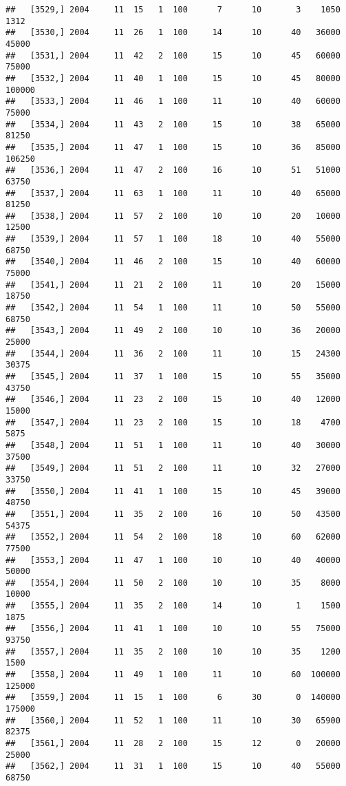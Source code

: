 \documentclass{article}\usepackage[]{graphicx}\usepackage[]{color}
\makeatletter
\newenvironment{kframe}{%
 \def\at@end@of@kframe{}%
 \ifinner\ifhmode%
  \def\at@end@of@kframe{\end{minipage}}%
  \begin{minipage}{\columnwidth}%
 \fi\fi%
 \def\FrameCommand##1{\hskip\@totalleftmargin \hskip-\fboxsep
 \colorbox{shadecolor}{##1}\hskip-\fboxsep
     \hskip-\linewidth \hskip-\@totalleftmargin \hskip\columnwidth}%
 \MakeFramed {\advance\hsize-\width
   \@totalleftmargin\z@ \linewidth\hsize
   \@setminipage}}%
 {\par\unskip\endMakeFramed%
 \at@end@of@kframe}
\newenvironment{knitrout}{}{} %
\makeatother
\begin{document}
\begin{knitrout}
\begin{kframe}
\begin{verbatim}
##   [3529,] 2004     11  15   1  100      7      10       3    1050    1312
##   [3530,] 2004     11  26   1  100     14      10      40   36000   45000
##   [3531,] 2004     11  42   2  100     15      10      45   60000   75000
##   [3532,] 2004     11  40   1  100     15      10      45   80000  100000
##   [3533,] 2004     11  46   1  100     11      10      40   60000   75000
##   [3534,] 2004     11  43   2  100     15      10      38   65000   81250
##   [3535,] 2004     11  47   1  100     15      10      36   85000  106250
##   [3536,] 2004     11  47   2  100     16      10      51   51000   63750
##   [3537,] 2004     11  63   1  100     11      10      40   65000   81250
##   [3538,] 2004     11  57   2  100     10      10      20   10000   12500
##   [3539,] 2004     11  57   1  100     18      10      40   55000   68750
##   [3540,] 2004     11  46   2  100     15      10      40   60000   75000
##   [3541,] 2004     11  21   2  100     11      10      20   15000   18750
##   [3542,] 2004     11  54   1  100     11      10      50   55000   68750
##   [3543,] 2004     11  49   2  100     10      10      36   20000   25000
##   [3544,] 2004     11  36   2  100     11      10      15   24300   30375
##   [3545,] 2004     11  37   1  100     15      10      55   35000   43750
##   [3546,] 2004     11  23   2  100     15      10      40   12000   15000
##   [3547,] 2004     11  23   2  100     15      10      18    4700    5875
##   [3548,] 2004     11  51   1  100     11      10      40   30000   37500
##   [3549,] 2004     11  51   2  100     11      10      32   27000   33750
##   [3550,] 2004     11  41   1  100     15      10      45   39000   48750
##   [3551,] 2004     11  35   2  100     16      10      50   43500   54375
##   [3552,] 2004     11  54   2  100     18      10      60   62000   77500
##   [3553,] 2004     11  47   1  100     10      10      40   40000   50000
##   [3554,] 2004     11  50   2  100     10      10      35    8000   10000
##   [3555,] 2004     11  35   2  100     14      10       1    1500    1875
##   [3556,] 2004     11  41   1  100     10      10      55   75000   93750
##   [3557,] 2004     11  35   2  100     10      10      35    1200    1500
##   [3558,] 2004     11  49   1  100     11      10      60  100000  125000
##   [3559,] 2004     11  15   1  100      6      30       0  140000  175000
##   [3560,] 2004     11  52   1  100     11      10      30   65900   82375
##   [3561,] 2004     11  28   2  100     15      12       0   20000   25000
##   [3562,] 2004     11  31   1  100     15      10      40   55000   68750

\end{verbatim}
\end{kframe}
\end{knitrout}
\end{document}
